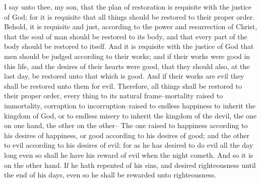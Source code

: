 I say unto thee, my son, that the plan of restoration is requisite with the justice of God; for it is requisite that all things should be restored to their proper order. Behold, it is requisite and just, according to the power and resurrection of Christ, that the soul of man should be restored to its body, and that every part of the body should be restored to itself.
\bverse \iffalse And it is requisite with the justice of God that men should be judged according to their works; and if their works were good in this life, and the desires of their hearts were good, that they should also, at the last day, be restored unto that which is good. \fi
And it is requisite with the justice of God that men should be judged according to their works; and if their works were good in this life, and the desires of their hearts were good, that they should also, at the last day, be restored unto that which is good.
\bverse \iffalse And if their works are evil they shall be restored unto them for evil. Therefore, all things shall be restored to their proper order, every thing to its natural frame--mortality raised to immortality, corruption to incorruption--raised to endless happiness to inherit the kingdom of God, or to endless misery to inherit the kingdom of the devil, the one on one hand, the other on the other-- \fi
And if their works are evil they shall be restored unto them for evil. Therefore, all things shall be restored to their proper order, every thing to its natural frame--mortality raised to immortality, corruption to incorruption--raised to endless happiness to inherit the kingdom of God, or to endless misery to inherit the kingdom of the devil, the one on one hand, the other on the other--
\bverse \iffalse The one raised to happiness according to his desires of happiness, or good according to his desires of good; and the other to evil according to his desires of evil; for as he has desired to do evil all the day long even so shall he have his reward of evil when the night cometh. \fi
The one raised to happiness according to his desires of happiness, or good according to his desires of good; and the other to evil according to his desires of evil; for as he has desired to do evil all the day long even so shall he have his reward of evil when the night cometh.
\bverse \iffalse And so it is on the other hand. If he hath repented of his sins, and desired righteousness until the end of his days, even so he shall be rewarded unto righteousness. \fi
And so it is on the other hand. If he hath repented of his sins, and desired righteousness until the end of his days, even so he shall be rewarded unto righteousness.
